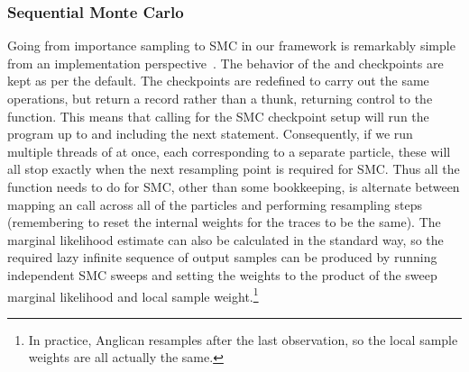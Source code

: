 \subsubsection{Sequential Monte Carlo}
\label{sec:proginf:str:part:smc}
\vspace{-5pt}
Going from importance sampling to SMC in our framework is remarkably simple
from an implementation perspective~\citep{wood2014new,paige2014compilation}.  The behavior of the \sample and  
checkpoints are kept as per the default.  
The \observe checkpoints are redefined
to carry out the same operations, but return a record rather
than a thunk, returning control to the \anginfer function.  This means that 
calling  for the SMC checkpoint setup will run the program up to and including
the next \observe statement.  Consequently, if we run multiple threads of  at
once, each corresponding to a separate particle, these will all stop exactly when
the next resampling point is required for SMC.  Thus all the \anginfer function needs
to do for SMC, other than some bookkeeping,
is alternate between mapping an  call across all of the particles and
performing resampling steps (remembering to reset the internal weights for the traces to
be the same).  The marginal likelihood estimate can also be calculated in
the standard way, so the required lazy infinite sequence
of output samples can be produced by running independent SMC sweeps and setting the weights
to the product of the sweep marginal likelihood and local sample weight.\footnote{In practice, Anglican
	resamples after the last observation, so the
	local sample weights are all actually the same.}

